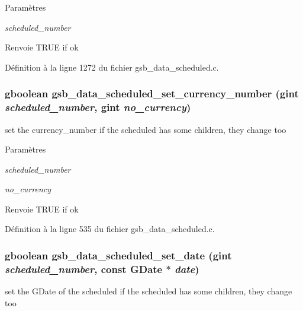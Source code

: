 \begin{DoxyParams}{Paramètres}
\item[{\em scheduled\_\-number}]\item[{\em }]\end{DoxyParams}
\begin{DoxyReturn}{Renvoie}
TRUE if ok 
\end{DoxyReturn}


Définition à la ligne 1272 du fichier gsb\_\-data\_\-scheduled.c.

\subsubsection[{gsb\_\-data\_\-scheduled\_\-set\_\-currency\_\-number}]{\setlength{\rightskip}{0pt plus 5cm}gboolean gsb\_\-data\_\-scheduled\_\-set\_\-currency\_\-number (gint {\em scheduled\_\-number}, \/  gint {\em no\_\-currency})}\label{gsb__data__scheduled_8h_a3825c62dc8b89912d6fe910f5190ab0e}
set the currency\_\-number if the scheduled has some children, they change too


\begin{DoxyParams}{Paramètres}
\item[{\em scheduled\_\-number}]\item[{\em no\_\-currency}]\end{DoxyParams}
\begin{DoxyReturn}{Renvoie}
TRUE if ok 
\end{DoxyReturn}


Définition à la ligne 535 du fichier gsb\_\-data\_\-scheduled.c.

\subsubsection[{gsb\_\-data\_\-scheduled\_\-set\_\-date}]{\setlength{\rightskip}{0pt plus 5cm}gboolean gsb\_\-data\_\-scheduled\_\-set\_\-date (gint {\em scheduled\_\-number}, \/  const GDate $\ast$ {\em date})}\label{gsb__data__scheduled_8h_a99a6e04b2a44d0050dd9c2028df91d6a}
set the GDate of the scheduled if the scheduled has some children, they change too


